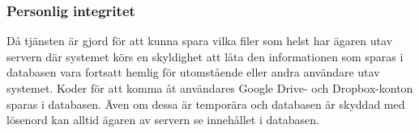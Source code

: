 \subsubsection{Personlig integritet}

Då tjänsten är gjord för att kunna spara vilka filer som helst har ägaren utav servern där systemet körs en skyldighet att låta den informationen som sparas i databasen vara fortsatt hemlig för utomstående eller andra användare utav systemet. Koder för att komma åt användares Google Drive- och Dropbox-konton sparas i databasen. Även om dessa är temporära och databasen är skyddad med lösenord kan alltid ägaren av servern se innehållet i databasen.
